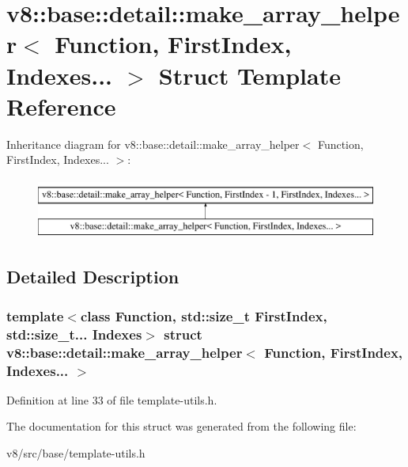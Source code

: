 \hypertarget{structv8_1_1base_1_1detail_1_1make__array__helper_3_01Function_00_01FirstIndex_00_01Indexes_8_8_8_01_4}{}\section{v8\+:\+:base\+:\+:detail\+:\+:make\+\_\+array\+\_\+helper$<$ Function, First\+Index, Indexes... $>$ Struct Template Reference}
\label{structv8_1_1base_1_1detail_1_1make__array__helper_3_01Function_00_01FirstIndex_00_01Indexes_8_8_8_01_4}
Inheritance diagram for v8\+:\+:base\+:\+:detail\+:\+:make\+\_\+array\+\_\+helper$<$ Function, First\+Index, Indexes... $>$\+:\begin{figure}[H]
\begin{center}
\leavevmode
\includegraphics[height=2.000000cm]{structv8_1_1base_1_1detail_1_1make__array__helper_3_01Function_00_01FirstIndex_00_01Indexes_8_8_8_01_4}
\end{center}
\end{figure}


\subsection{Detailed Description}
\subsubsection*{template$<$class Function, std\+::size\+\_\+t First\+Index, std\+::size\+\_\+t... Indexes$>$\newline
struct v8\+::base\+::detail\+::make\+\_\+array\+\_\+helper$<$ Function, First\+Index, Indexes... $>$}



Definition at line 33 of file template-\/utils.\+h.



The documentation for this struct was generated from the following file\+:\begin{DoxyCompactItemize}
\item 
v8/src/base/template-\/utils.\+h\end{DoxyCompactItemize}
